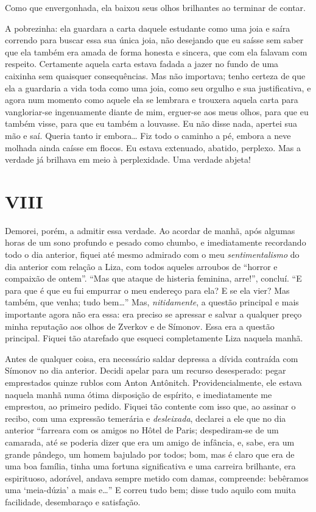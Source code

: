 Como que envergonhada, ela baixou seus olhos brilhantes ao terminar de
contar.

A pobrezinha: ela guardara a carta daquele estudante como uma joia e
saíra correndo para buscar essa sua única joia, não desejando que eu
saísse sem saber que ela também era amada de forma honesta e sincera,
que com ela falavam com respeito. Certamente aquela carta estava fadada
a jazer no fundo de uma caixinha sem quaisquer consequências. Mas não
importava; tenho certeza de que ela a guardaria a vida toda como uma
joia, como seu orgulho e sua justificativa, e agora num momento como
aquele ela se lembrara e trouxera aquela carta para vangloriar-se
ingenuamente diante de mim, erguer-se aos meus olhos, para que eu
também visse, para que eu também a louvasse. Eu não disse nada, apertei
sua mão e saí. Queria tanto ir embora\ldots{} Fiz todo o caminho a pé,
embora a neve molhada ainda caísse em flocos. Eu estava extenuado,
abatido, perplexo. Mas a verdade já brilhava em meio à perplexidade.
Uma verdade abjeta!


\section{VIII}

Demorei, porém, a admitir essa verdade. Ao acordar de manhã, após
algumas horas de um sono profundo e pesado como chumbo, e imediatamente
recordando todo o dia anterior, fiquei até mesmo admirado com o meu
\textit{sentimentalismo} do dia anterior com relação a Liza, com todos
aqueles arroubos de “horror e compaixão de ontem”. “Mas que ataque de
histeria feminina, arre!”, concluí. “E para que é que eu fui empurrar o
meu endereço para ela? E se ela vier? Mas também, que venha; tudo
bem\ldots{}” Mas, \textit{nitidamente}, a questão principal e mais
importante agora não era essa: era preciso se apressar e salvar a
qualquer preço minha reputação aos olhos de Zverkov e de Símonov. Essa
era a questão principal. Fiquei tão atarefado que esqueci completamente
Liza naquela manhã.

Antes de qualquer coisa, era necessário saldar depressa a dívida
contraída com Símonov no dia anterior. Decidi apelar para um recurso
desesperado: pegar emprestados quinze rublos com Anton Antônitch.
Providencialmente, ele estava naquela manhã numa ótima disposição de
espírito, e imediatamente me emprestou, ao primeiro pedido. Fiquei tão
contente com isso que, ao assinar o recibo, com uma expressão temerária
e \textit{desleixada}, declarei a ele que no dia anterior “farreara com
os amigos no Hôtel de Paris; despediram-se de um
camarada, até se poderia dizer que era um amigo de infância, e, sabe,
era um grande pândego, um homem bajulado por todos; bom, mas é claro
que era de uma boa família, tinha uma fortuna significativa e uma
carreira brilhante, era espirituoso, adorável, andava sempre metido com
damas, compreende: bebêramos uma ‘meia-dúzia’ a mais e\ldots{}” E correu
tudo bem; disse tudo aquilo com muita facilidade, desembaraço e
satisfação.

